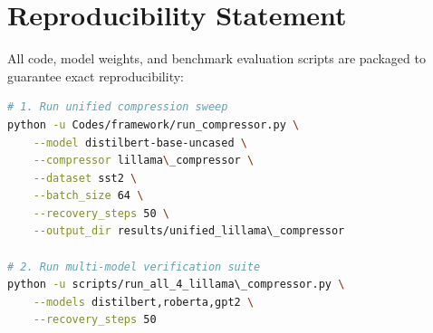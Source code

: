 \section{Reproducibility Statement}
All code, model weights, and benchmark evaluation scripts are packaged to guarantee exact reproducibility:
\begin{lstlisting}[language=bash]
# 1. Run unified compression sweep
python -u Codes/framework/run_compressor.py \
    --model distilbert-base-uncased \
    --compressor lillama\_compressor \
    --dataset sst2 \
    --batch_size 64 \
    --recovery_steps 50 \
    --output_dir results/unified_lillama\_compressor

# 2. Run multi-model verification suite
python -u scripts/run_all_4_lillama\_compressor.py \
    --models distilbert,roberta,gpt2 \
    --recovery_steps 50
\end{lstlisting}
